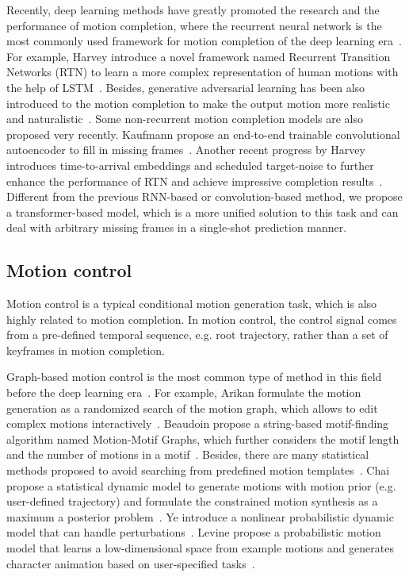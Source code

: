 \documentclass[10pt,twocolumn,letterpaper]{article}
\begin{document}
Recently, deep learning methods have greatly promoted the research and the performance of motion completion, where the recurrent neural network is the most commonly used framework for motion completion of the deep learning era~\cite{zhang2018data,harvey2018recurrent}. For example, Harvey \etal introduce a novel framework named Recurrent Transition Networks (RTN) to learn a more complex representation of human motions with the help of LSTM~\cite{harvey2018recurrent}. Besides, generative adversarial learning has been also introduced to the motion completion to make the output motion more realistic and naturalistic~\cite{hernandez2019human}. Some non-recurrent motion completion models are also proposed very recently. Kaufmann \etal propose an end-to-end trainable convolutional autoencoder to fill in missing frames~\cite{kaufmann2020infilling}. Another recent progress by Harvey \etal introduces time-to-arrival embeddings and scheduled target-noise to further enhance the performance of RTN and achieve impressive completion results~\cite{harvey2020robust}. Different from the previous RNN-based or convolution-based method, we propose a transformer-based model, which is a more unified solution to this task and can deal with arbitrary missing frames in a single-shot prediction manner. 

\subsection{Motion control} 

Motion control is a typical conditional motion generation task, which is also highly related to motion completion. In motion control, the control signal comes from a pre-defined temporal sequence, e.g. root trajectory, rather than a set of keyframes in motion completion.

Graph-based motion control is the most common type of method in this field before the deep learning era~\cite{lee2002interactive,safonova2007construction,kovar2008motion,arikan2002interactive,beaudoin2008motion}. For example, Arikan \etal formulate the motion generation as a randomized search of the motion graph, which allows to edit complex motions interactively~\cite{arikan2002interactive}. Beaudoin \etal propose a string-based motif-finding algorithm named Motion-Motif Graphs, which further considers the motif length and the number of motions in a motif~\cite{beaudoin2008motion}. Besides, there are many statistical methods proposed to avoid searching from predefined motion templates~\cite{grochow2004style,wang2007gaussian,min2009interactive,min2012motion}. Chai \etal propose a statistical dynamic model to generate motions with motion prior (e.g. user-defined trajectory) and formulate the constrained motion synthesis as a maximum a posterior problem~\cite{chai2007constraint}. Ye \etal introduce a nonlinear probabilistic dynamic model that can handle perturbations~\cite{ye2010synthesis}. Levine \etal propose a probabilistic motion model that learns a low-dimensional space from example motions and generates character animation based on user-specified tasks~\cite{levine2012continuous}.
\end{document}
